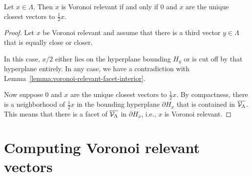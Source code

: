 \begin{lemma}
  \label{lemma:voronoi-relevant-as-closest}
  Let $x \in \Lambda$.
  Then $x$ is Voronoi relevant if and only if
  $0$ and $x$ are the unique closest vectors to $\frac{1}{2} x$.
\end{lemma}
\begin{proof}
  Let $x$ be Voronoi relevant and
  assume that there is a third vector $y \in \Lambda$ that is equally close or closer.
  \begin{center}
  \end{center}
  In this case, $x/2$ either lies on the hyperplane bounding $H_y$
  or is cut off by that hyperplane entirely.
  In any case, we have a contradiction with Lemma~\ref{lemma:voronoi-relevant-facet-interior}.

  Now suppose $0$ and $x$ are the unique closest vectors to $\frac{1}{2} x$.
  By compactness, there is a neighborhood of $\frac{1}{2} x$
  in the bounding hyperplane $\partial H_x$ that is contained in $\overline{\mathcal{V}_\Lambda}$.
  This means that there is a facet of $\overline{\mathcal{V}_\Lambda}$ in $\partial H_x$,
  i.e., $x$ is Voronoi relevant.
\end{proof}



\section{Computing Voronoi relevant vectors}

